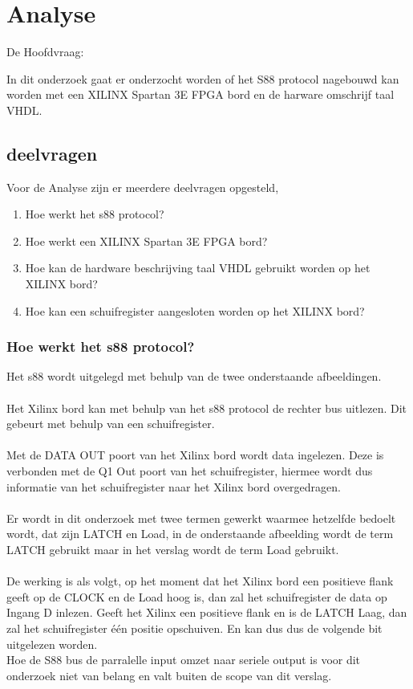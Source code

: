 \chapter{Analyse}
De Hoofdvraag:

In dit onderzoek gaat er onderzocht worden of het S88 protocol nagebouwd kan worden met een XILINX Spartan 3E FPGA bord en de harware omschrijf taal VHDL.
\section{deelvragen}
Voor de Analyse zijn er meerdere deelvragen opgesteld,

\begin{enumerate}
	\item Hoe werkt het s88 protocol?
	\item Hoe werkt een XILINX Spartan 3E FPGA bord?
	\item Hoe kan de hardware beschrijving taal VHDL gebruikt worden op het XILINX bord?
	\item Hoe kan een schuifregister aangesloten worden op het XILINX bord?
\end{enumerate}

\subsection{Hoe werkt het s88 protocol?}
Het s88 wordt uitgelegd met behulp van de twee onderstaande afbeeldingen.
\\\\
Het Xilinx bord kan met behulp van het s88 protocol de rechter bus uitlezen. Dit gebeurt met behulp van een schuifregister.
\\\\
Met de DATA OUT poort van het Xilinx bord wordt data ingelezen. Deze is verbonden met de Q1 Out poort van het schuifregister, hiermee wordt dus informatie van het schuifregister naar het Xilinx bord overgedragen.
\\\\
Er wordt in dit onderzoek met twee termen gewerkt waarmee hetzelfde bedoelt wordt, dat zijn LATCH en Load, in de onderstaande afbeelding wordt de term LATCH gebruikt maar in het verslag wordt de term Load gebruikt.\\\\


De werking is als volgt, op het moment dat het Xilinx bord een positieve flank geeft op de CLOCK en de Load hoog is, dan zal het schuifregister de data op Ingang D inlezen. Geeft het Xilinx een positieve flank en is de LATCH Laag, dan zal het schuifregister één positie opschuiven. En kan dus dus de volgende bit uitgelezen worden.\\
Hoe de S88 bus de parralelle input omzet naar seriele output is voor dit onderzoek niet van belang en valt buiten de scope van dit verslag.	
\\ 

